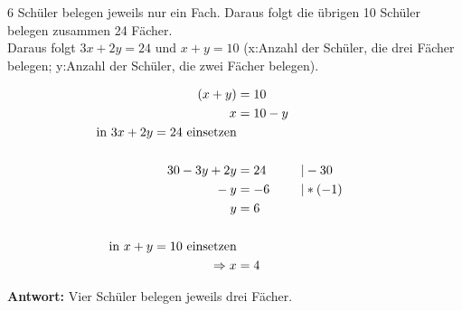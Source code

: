 \documentclass[12pt,letterpaper]{article}
\newcommand{\alignleft}[1]{\tag*{\llap{\makebox[\linewidth][l]{$#1$}}}}
\newcommand{\LLeftrightarrow}{ \alignleft{\Leftrightarrow}}
\newcommand{\eqinfo}[1]{&\makebox[2cm][l]{$\vert #1$}}
\newcommand{\Eqn}[2]{#1 &= #2}
\newcommand{\eqnf}[2]{\Eqn{#1}{#2}\\}
\newcommand{\eqn}[2]{\LLeftrightarrow\Eqn{#1}{#2}\\}
\newcommand{\eqni}[3]{\LLeftrightarrow\Eqn{#1}{#2}\eqinfo{#3}\\}
\begin{document}
\begin{enumerate}
6 Schüler belegen jeweils nur ein Fach. Daraus folgt die übrigen 10 Schüler belegen zusammen 24 Fächer.\\
Daraus folgt $3x + 2y = 24$ und $x+y=10$ (x:Anzahl der Schüler, die drei Fächer belegen; y:Anzahl der Schüler, die zwei Fächer belegen).

\begin{align*}
	 \eqnf{(x+y)}{10}
	 \eqn{x}{10-y}
	 \text{in } 3x + 2y = 24 \text{ einsetzen}\\
	 \\
	 \eqni{30-3y+2y}{24}{-30}
	 \eqni{-y}{-6}{*(-1)}
	 \eqn{y}{6}
	 \\
	 \text{in } x+y=10 \text{ einsetzen}\\
	 \Rightarrow x&=4
\end{align*}

\textbf{Antwort:} Vier Schüler belegen jeweils drei Fächer.

\end{enumerate}
\end{document}
